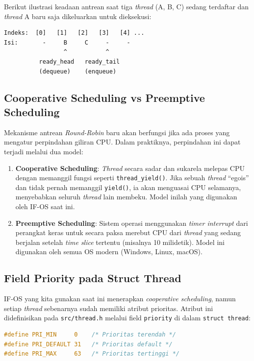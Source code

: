 Berikut ilustrasi keadaan antrean saat tiga \textit{thread} (A, B, C) sedang terdaftar dan \textit{thread} A baru saja dikeluarkan untuk dieksekusi:

\begin{lstlisting}[caption={Ilustrasi circular array ready\_queue}]
Indeks:  [0]   [1]   [2]   [3]   [4] ...
Isi:       -     B     C     -     -
                 ^           ^
          ready_head   ready_tail
          (dequeue)    (enqueue)
\end{lstlisting}

\subsection{Cooperative Scheduling vs Preemptive Scheduling}
Mekanisme antrean \textit{Round-Robin} baru akan berfungsi jika ada proses yang mengatur perpindahan giliran CPU. Dalam praktiknya, perpindahan ini dapat terjadi melalui dua model:

\begin{enumerate}
	\item \textbf{Cooperative Scheduling}: \textit{Thread} secara sadar dan sukarela melepas CPU dengan memanggil fungsi seperti \texttt{thread\_yield()}. Jika sebuah \textit{thread} ``egois'' dan tidak pernah memanggil \texttt{yield()}, ia akan menguasai CPU selamanya, menyebabkan seluruh \textit{thread} lain membeku. Model inilah yang digunakan oleh IF-OS saat ini.

	\item \textbf{Preemptive Scheduling}: Sistem operasi menggunakan \textit{timer interrupt} dari perangkat keras untuk secara paksa merebut CPU dari \textit{thread} yang sedang berjalan setelah \textit{time slice} tertentu (misalnya 10 milidetik). Model ini digunakan oleh semua OS modern (Windows, Linux, macOS).
\end{enumerate}

\subsection{Field Priority pada Struct Thread}
IF-OS yang kita gunakan saat ini menerapkan \textit{cooperative scheduling}, namun setiap \textit{thread} sebenarnya sudah memiliki atribut prioritas. Atribut ini didefinisikan pada \texttt{src/thread.h} melalui field \texttt{priority} di dalam \texttt{struct thread}:

\begin{lstlisting}[language=C, caption={Definisi konstanta prioritas pada thread.h}]
#define PRI_MIN     0    /* Prioritas terendah */
#define PRI_DEFAULT 31   /* Prioritas default */
#define PRI_MAX     63   /* Prioritas tertinggi */
\end{lstlisting}

